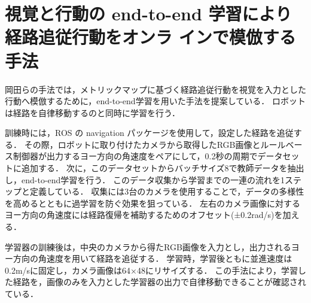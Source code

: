 \section{視覚と行動の end-to-end 学習により経路追従行動をオンラ
インで模倣する手法}
岡田らの手法では，メトリックマップに基づく経路追従行動を視覚を入力とした行動へ模倣するために，end-to-end学習を用いた手法を提案している．
ロボットは経路を自律移動するのと同時に学習を行う．

訓練時には，ROS の navigation パッケージを使用して，設定した経路を追従する．
その際，ロボットに取り付けたカメラから取得したRGB画像とルールベース制御器が出力するヨー方向の角速度をペアにして，0.2秒の周期でデータセットに追加する．
次に，このデータセットからバッチサイズ8で教師データを抽出し，end-to-end学習を行う．
このデータ収集から学習までの一連の流れを1ステップと定義している．
収集には3台のカメラを使用することで，データの多様性を高めるとともに過学習を防ぐ効果を狙っている．
左右のカメラ画像に対するヨー方向の角速度には経路復帰を補助するためのオフセット(±0.2rad/s)を加える．

学習器の訓練後は，中央のカメラから得たRGB画像を入力とし，出力されるヨー方向の角速度を用いて経路を追従する．
学習時，学習後ともに並進速度は0.2m/sに固定し，カメラ画像は64×48にリサイズする．
この手法により，学習した経路を，画像のみを入力とした学習器の出力で自律移動できることが確認されている．